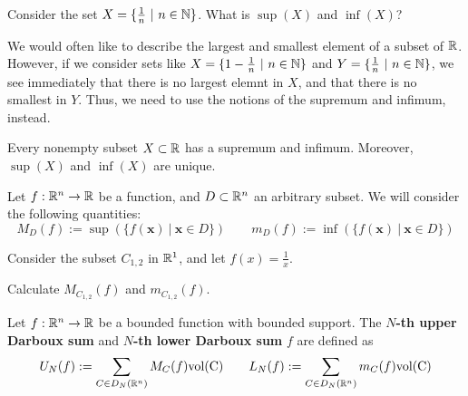    
    \begin{example}
        Consider the set $X = \{\frac{1}{n} \ | \ n \in \mathbb{N} \}$.  What is $\sup(X)$ and  $\inf(X)$?
    \end{example}

    We would often like to describe the largest and smallest element of a subset of $\R$.  However, if we consider sets like $X = \{1-\frac{1}{n} \ | \ n \in \mathbb{N} \}$ and $Y = \{\frac{1}{n} \ | \ n \in \mathbb{N} \}$, we see immediately that there is no largest elemnt in $X$, and that there is no smallest in $Y$.  Thus, we need to use the notions of the supremum and infimum, instead.


    

    \begin{theorem}[Completeness of $\R$]\label{thm:completness}
    Every nonempty subset $X \subset \mathbb{R}$ has a supremum and infimum. Moreover, $\sup(X)$ and $\inf(X)$ are unique.
    \end{theorem}



    \begin{definition}
    Let $f: \mathbb{R}^n \to \mathbb{R}$ be a function, and $D \subset \mathbb{R}^n$ an arbitrary subset. We will consider the following quantities:
    $$M_D(f) := \sup(\{f(\bm{x}) \ | \ \bm{x} \in D\}) \qquad m_D(f) := \inf(\{f(\bm{x}) \ | \ \bm{x} \in D\})$$
    
    \end{definition}

    \begin{example}
        Consider the subset $C_{1,2}$ in $\mathbb{R}^1$, and let $f(x) = \frac{1}{x}$.  
        
        Calculate $M_{C_{1,2}}(f)$ and $m_{C_{1,2}}(f)$.
    \end{example}


    
    \begin{definition}
    Let $f: \mathbb{R}^n \to \mathbb{R}$ be a bounded function with bounded support. The $N$\textbf{-th upper Darboux sum} and $N$\textbf{-th lower Darboux sum} $f$ are defined as 
    $$U_N(f) := \sum_{C \in D_N(\mathbb{R}^n)} M_C(f)\textnormal{vol(C)} \qquad L_N(f) := \sum_{C \in D_N(\mathbb{R}^n)} m_C(f)\textnormal{vol(C)}$$
    
    \end{definition}

